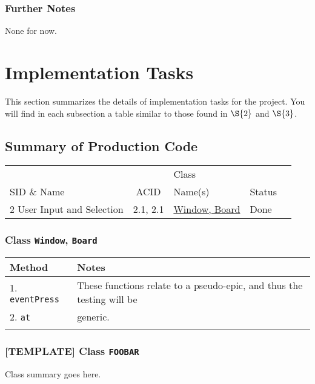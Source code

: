 \documentclass[11pt]{article}
\begin{document}
\subsubsection*{Further Notes}
\label{sec:org31ead6b}
None for now.

\section{Implementation Tasks}
\label{sec:org3118052}
This section summarizes the details of implementation tasks for the project. You will find in each
subsection a table similar to those found in \hyperref[sec:orgb019917]{\(\S{2}\)} and \hyperref[sec:org7eeeae9]{\(\S{3}\)}.

\subsection{Summary of Production Code}
\label{sec:orgff1af64}

\begin{center}
\begin{tabular}{|p{4.5cm}|c|p{3.5cm}|p{4.5cm}|c|}
 &  & Class & \\
SID \& Name & ACID & Name(s) & Status\\
\hline
2 User Input and Selection & 2.1, 2.1 & \hyperref[sec:org1be8069]{Window, Board} & Done\\
\end{tabular}
\end{center}

\subsubsection{Class \texttt{Window}, \texttt{Board}}
\label{sec:org1be8069}
\begin{center}
\begin{tabular}{|l|l|}
Method & Notes\\
\hline
1. \texttt{eventPress} & These functions relate to a pseudo-epic, and thus the testing will be\\
2. \texttt{at} & generic.\\
 & \\
\end{tabular}
\end{center}


\subsubsection*{[TEMPLATE] Class \texttt{FOOBAR}}
\label{sec:org709eadb}
Class summary goes here.
\end{document}
